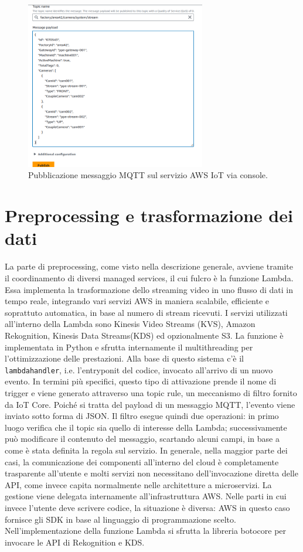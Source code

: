 \begin{figure}[htbp]
    \centering
    \includegraphics[width=0.7\textwidth]{figures/publish-example.png}
    \caption{Pubblicazione messaggio MQTT sul servizio AWS IoT via console.} 
    \label{fig:IoT-publish}
\end{figure}

 
\section{Preprocessing e trasformazione dei dati}
La parte di preprocessing, come visto nella descrizione generale, avviene tramite il coordinamento di diversi managed services, il cui fulcro è la funzione Lambda. Essa implementa la trasformazione dello streaming video in uno flusso di dati in tempo reale, integrando vari servizi AWS in maniera scalabile, efficiente e soprattuto automatica, in base al numero di stream ricevuti. I servizi utilizzati all'interno della Lambda sono Kinesis Video Streams (KVS), Amazon Rekognition, Kinesis Data Streams(KDS) ed opzionalmente S3. La funzione è implementata in Python e sfrutta internamente il multithreading per l'ottimizzazione delle prestazioni. Alla base di questo sistema c'è il \texttt{lambda\textunderscore handler}, i.e. l'entryponit del codice, invocato all’arrivo di un nuovo evento. In termini più specifici, questo tipo di attivazione prende il nome di trigger e viene generato attraverso una topic rule, un meccanismo di filtro fornito da IoT Core. Poiché si tratta del payload di un messaggio MQTT, l'evento viene inviato sotto forma di JSON. Il filtro esegue quindi due operazioni: in primo luogo verifica che il topic sia quello di interesse della Lambda; successivamente può modificare il contenuto del messaggio, scartando alcuni campi, in base a come è stata definita la regola sul servizio. In generale, nella maggior parte dei casi, la comunicazione dei componenti all'interno del cloud è completamente trasparente all'utente e molti servizi non necessitano dell'invocazione diretta delle API, come invece capita normalmente nelle architetture a microservizi. La gestione viene delegata internamente all'infrastruttura AWS. Nelle parti in cui invece l'utente deve scrivere codice, la situazione è diversa: AWS in questo caso fornisce gli SDK in base al linguaggio di programmazione scelto. Nell'implementazione della funzione Lambda si sfrutta la libreria botocore per invocare le API di Rekognition e KDS.

